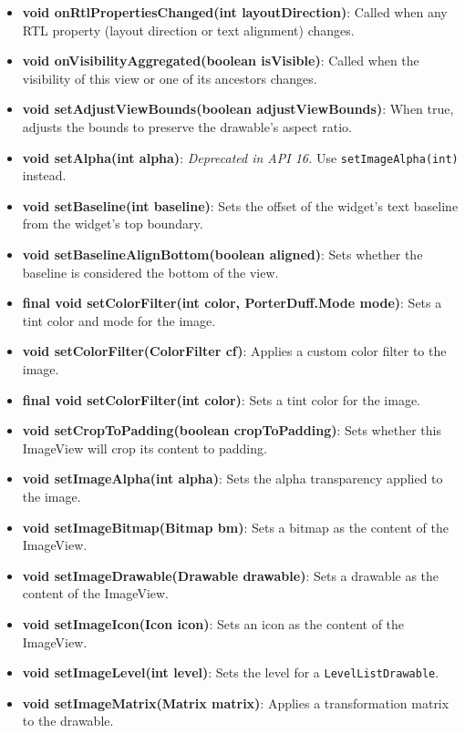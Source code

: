 \documentclass{report}
\begin{document}
\begin{itemize}
\begin{itemize}
                \item \textbf{void onRtlPropertiesChanged(int layoutDirection)}: Called when any RTL property (layout direction or text alignment) changes.
                \item \textbf{void onVisibilityAggregated(boolean isVisible)}: Called when the visibility of this view or one of its ancestors changes.
                \item \textbf{void setAdjustViewBounds(boolean adjustViewBounds)}: When true, adjusts the bounds to preserve the drawable's aspect ratio.
                \item \textbf{void setAlpha(int alpha)}: \textit{Deprecated in API 16.} Use \texttt{setImageAlpha(int)} instead.
                \item \textbf{void setBaseline(int baseline)}: Sets the offset of the widget's text baseline from the widget's top boundary.
                \item \textbf{void setBaselineAlignBottom(boolean aligned)}: Sets whether the baseline is considered the bottom of the view.
                \item \textbf{final void setColorFilter(int color, PorterDuff.Mode mode)}: Sets a tint color and mode for the image.
                \item \textbf{void setColorFilter(ColorFilter cf)}: Applies a custom color filter to the image.
                \item \textbf{final void setColorFilter(int color)}: Sets a tint color for the image.
                \item \textbf{void setCropToPadding(boolean cropToPadding)}: Sets whether this ImageView will crop its content to padding.
                \item \textbf{void setImageAlpha(int alpha)}: Sets the alpha transparency applied to the image.
                \item \textbf{void setImageBitmap(Bitmap bm)}: Sets a bitmap as the content of the ImageView.
                \item \textbf{void setImageDrawable(Drawable drawable)}: Sets a drawable as the content of the ImageView.
                \item \textbf{void setImageIcon(Icon icon)}: Sets an icon as the content of the ImageView.
                \item \textbf{void setImageLevel(int level)}: Sets the level for a \texttt{LevelListDrawable}.
                \item \textbf{void setImageMatrix(Matrix matrix)}: Applies a transformation matrix to the drawable.

\end{itemize}
\end{itemize}
\end{document}

